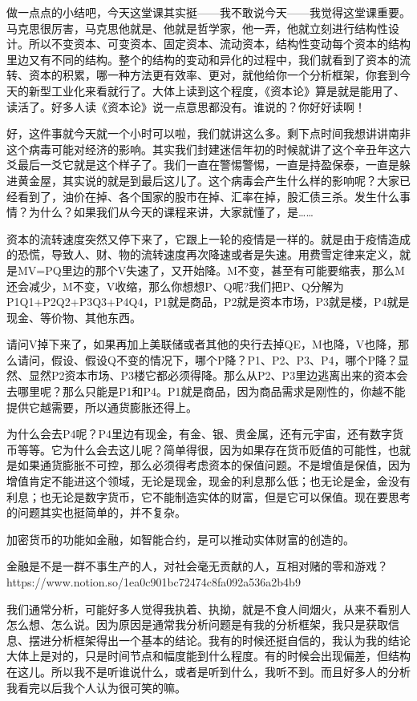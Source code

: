 \documentclass[UTF8, 12pt, a4paper]{ctexrep}
\begin{document}
做一点点的小结吧，今天这堂课其实挺——我不敢说今天——我觉得这堂课重要。马克思很厉害，马克思他就是、他就是哲学家，他一弄，他就立刻进行结构性设计。所以不变资本、可变资本、固定资本、流动资本，结构性变动每个资本的结构里边又有不同的结构。整个的结构的变动和异化的过程中，我们就看到了资本的流转、资本的积累，哪一种方法更有效率、更对，就他给你一个分析框架，你套到今天的新型工业化来看就行了。大体上读到这个程度，《资本论》算是就是能用了、读活了。好多人读《资本论》说一点意思都没有。谁说的？你好好读啊！

好，这件事就今天就一个小时可以啦，我们就讲这么多。剩下点时间我想讲讲南非这个病毒可能对经济的影响。其实我们封建迷信年初的时候就讲了这个辛丑年这六爻最后一爻它就是这个样子了。我们一直在警惕警惕，一直是持盈保泰，一直是躲进黄金屋，其实说的就是到最后这儿了。这个病毒会产生什么样的影响呢？大家已经看到了，油价在掉、各个国家的股市在掉、汇率在掉，股汇债三杀。发生什么事情？为什么？如果我们从今天的课程来讲，大家就懂了，是……

资本的流转速度突然又停下来了，它跟上一轮的疫情是一样的。就是由于疫情造成的恐慌，导致人、财、物的流转速度再次降速或者是失速。用费雪定律来定义，就是MV=PQ里边的那个V失速了，又开始降。M不变，甚至有可能要缩表，那么M还会减少，M不变，V收缩，那么你想想P、Q呢?我们把P、Q分解为P1Q1+P2Q2+P3Q3+P4Q4，P1就是商品，P2就是资本市场，P3就是楼，P4就是现金、等价物、其他东西。

请问V掉下来了，如果再加上美联储或者其他的央行去掉QE，M也降，V也降，那么请问，假设、假设Q不变的情况下，哪个P降？P1、P2、P3、P4，哪个P降？显然、显然P2资本市场、P3楼它都必须得降。那么从P2、P3里边逃离出来的资本会去哪里呢？那么只能是P1和P4。P1就是商品，因为商品需求是刚性的，你越不能提供它越需要，所以通货膨胀还得上。

为什么会去P4呢？P4里边有现金，有金、银、贵金属，还有元宇宙，还有数字货币等等。它为什么会去这儿呢？简单得很，因为如果存在货币贬值的可能性，也就是如果通货膨胀不可控，那么必须得考虑资本的保值问题。不是增值是保值，因为增值肯定不能进这个领域，无论是现金，现金的利息那么低；也无论是金，金没有利息；也无论是数字货币，它不能制造实体的财富，但是它可以保值。现在要思考的问题其实也挺简单的，并不复杂。

{\kaishu 加密货币的功能如金融，如智能合约，是可以推动实体财富的创造的。

金融是不是一群不事生产的人，对社会毫无贡献的人，互相对赌的零和游戏？ https://www.notion.so/1ea0c901bc72474c8fa092a536a2b4b9}

我们通常分析，可能好多人觉得我执着、执拗，就是不食人间烟火，从来不看别人怎么想、怎么说。因为原因是通常我分析问题是有我的分析框架，我只是获取信息、摆进分析框架得出一个基本的结论。我有的时候还挺自信的，我认为我的结论大体上是对的，只是时间节点和幅度能到什么程度。有的时候会出现偏差，但结构在这儿。所以我不是听谁说什么，或者是听到什么，我听不到。而且好多人的分析我看完以后我个人认为很可笑的嘛。
\end{document}
